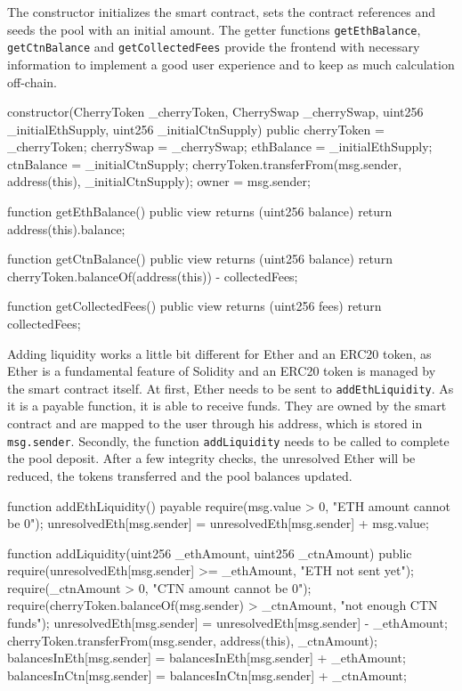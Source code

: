 The constructor initializes the smart contract, sets the contract references and seeds the pool with an initial amount. The getter functions \texttt{getEthBalance}, \texttt{getCtnBalance} and \texttt{getCollectedFees} provide the frontend with necessary information to implement a good user experience and to keep as much calculation off-chain.
\begin{GenericCode}
constructor(CherryToken _cherryToken, CherrySwap _cherrySwap, uint256 _initialEthSupply, uint256 _initialCtnSupply) public {
  cherryToken = _cherryToken;
  cherrySwap = _cherrySwap;
  ethBalance = _initialEthSupply;
  ctnBalance = _initialCtnSupply;
  cherryToken.transferFrom(msg.sender, address(this), _initialCtnSupply);
  owner = msg.sender;
}

function getEthBalance() public view returns (uint256 balance) {
  return address(this).balance;
}

function getCtnBalance() public view returns (uint256 balance) {
  return cherryToken.balanceOf(address(this)) - collectedFees;
}

function getCollectedFees() public view returns (uint256 fees) {
  return collectedFees;
}
\end{GenericCode}

Adding liquidity works a little bit different for Ether and an ERC20 token, as Ether is a fundamental feature of Solidity and an ERC20 token is managed by the smart contract itself. At first, Ether needs to be sent to \texttt{addEthLiquidity}. As it is a payable function, it is able to receive funds. They are owned by the smart contract and are mapped to the user through his address, which is stored in \texttt{msg.sender}. Secondly, the function \texttt{addLiquidity} needs to be called to complete the pool deposit. After a few integrity checks, the unresolved Ether will be reduced, the tokens transferred and the pool balances updated.
\begin{GenericCode}
function addEthLiquidity() payable {
  require(msg.value > 0, "ETH amount cannot be 0");
  unresolvedEth[msg.sender] = unresolvedEth[msg.sender] + msg.value;
}

function addLiquidity(uint256 _ethAmount, uint256 _ctnAmount) public {
  require(unresolvedEth[msg.sender] >= _ethAmount, "ETH not sent yet");
  require(_ctnAmount > 0, "CTN amount cannot be 0");
  require(cherryToken.balanceOf(msg.sender) > _ctnAmount, "not enough CTN funds");
  unresolvedEth[msg.sender] = unresolvedEth[msg.sender] - _ethAmount;
  cherryToken.transferFrom(msg.sender, address(this), _ctnAmount);
  balancesInEth[msg.sender] = balancesInEth[msg.sender] + _ethAmount;
  balancesInCtn[msg.sender] = balancesInCtn[msg.sender] + _ctnAmount;
}	
\end{GenericCode}

